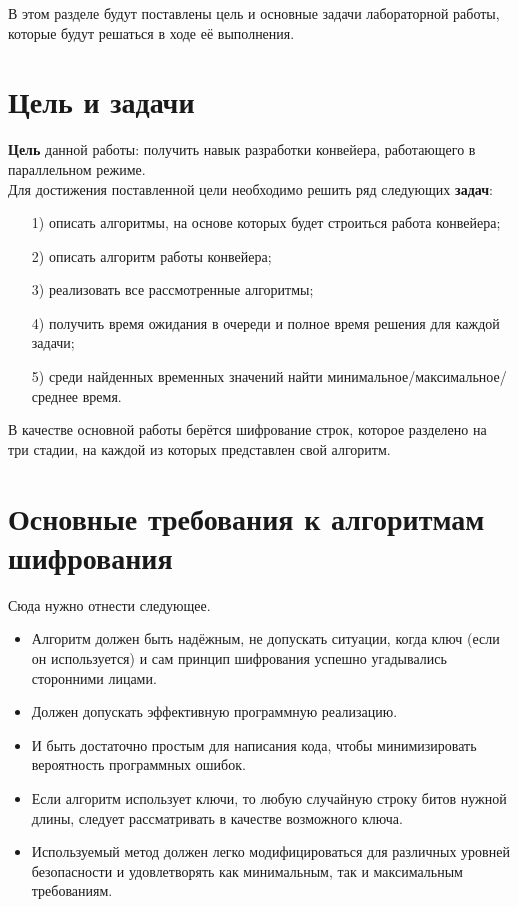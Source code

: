 В этом разделе будут поставлены цель и основные задачи лабораторной работы, которые будут решаться в ходе её выполнения.

\section{Цель и задачи}
\qquad\textbf{Цель} данной работы: получить навык разработки конвейера, работающего в параллельном режиме.\\

Для достижения поставленной цели необходимо решить ряд следующих \textbf{задач}:
\begin{enumerate}
	\item[1)] описать алгоритмы, на основе которых будет строиться работа конвейера;
	\item[2)] описать алгоритм работы конвейера;
	\item[3)] реализовать все рассмотренные алгоритмы;
	\item[4)] получить время ожидания в очереди и полное время решения для каждой задачи;
	\item[5)] среди найденных временных значений найти минимальное/максимальное/среднее время.
\end{enumerate}

В качестве основной работы берётся шифрование строк, которое разделено на три стадии, на каждой из которых представлен свой алгоритм.

\section{Основные требования к алгоритмам шифрования}
Сюда нужно отнести следующее.
\begin{itemize}
	\item Алгоритм должен быть надёжным, не допускать ситуации, когда ключ (если он используется) и сам принцип шифрования успешно угадывались сторонними лицами.
	\item Должен допускать эффективную программную реализацию.
	\item И быть достаточно простым для написания кода, чтобы минимизировать вероятность программных ошибок.
	\item Если алгоритм использует ключи, то любую случайную строку битов нужной длины, следует рассматривать в качестве возможного ключа.
	\item Используемый метод должен легко модифицироваться для различных уровней безопасности и удовлетворять как минимальным, так и максимальным требованиям.
\end{itemize}

